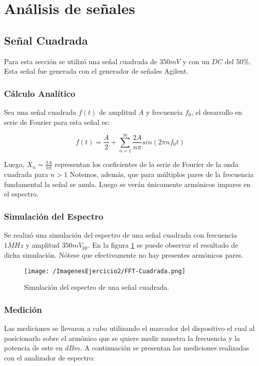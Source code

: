 \section{Análisis de señales}

\subsection{Señal Cuadrada}

Para esta sección se utilizó una señal cuadrada de $350mV$ y con un $DC$ del 50\%. Esta señal fue generada con el generador de señales Agilent.

\subsubsection{Cálculo Analítico}

Sea una señal cuadrada $f(t)$ de amplitud $A$ y frecuencia $f_0$, el desarrollo en serie de Fourier para esta señal es:

\begin{equation}
    f(t)=\frac{A}{2}+\sum_{n=1}^{\infty} \frac{2A}{n\pi}sin(2\pi n f_0t)
    \label{eq:fouriercuadrada}
\end{equation}

Luego, $X_n=\frac{2A}{n\pi}$ representan los coeficientes de la serie de Fourier de la onda cuadrada para $n>1$ Notemos, además, que para múltiplos pares de la frecuencia fundamental la señal se anula. Luego se verán únicamente armónicos impares en el espectro.

\subsubsection{Simulación del Espectro}

Se realizó una simulación del espectro de una señal cuadrada con frecuencia $1 MHz$ y amplitud $350 mV_{pp}$. En la figura \ref{fig:simcuad} se puede observar el resultado de dicha simulación. Nótese que efectivamente no hay presentes armónicos pares.

\begin{figure}[H]
	\centering
	\texttt{[image: /ImagenesEjercicio2/FFT-Cuadrada.png]}
\caption{Simulación del espectro de una señal cuadrada.}
	\label{fig:simcuad}
\end{figure}


\subsubsection{Medición}
Las mediciones se llevaron a cabo utilizando el marcador del dispositivo el cual al posicionarlo sobre el armónico que se quiere medir muestra la frecuencia y la potencia de este en $dBm$. A continuación se presentan las mediciones realizadas con el analizador de espectro:

